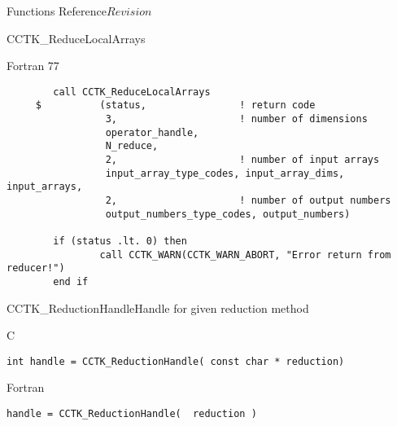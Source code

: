 \begin{cactuspart}{ Functions Reference}{}{$Revision$}
\begin{FunctionDescription}{CCTK\_ReduceLocalArrays}
\begin{ExampleSection}
\begin{Example}{Fortran 77}
\begin{verbatim}
        call CCTK_ReduceLocalArrays
     $          (status,                ! return code
                 3,                     ! number of dimensions
                 operator_handle,
                 N_reduce,
                 2,                     ! number of input arrays
                 input_array_type_codes, input_array_dims, input_arrays,
                 2,                     ! number of output numbers
                 output_numbers_type_codes, output_numbers)

        if (status .lt. 0) then
                call CCTK_WARN(CCTK_WARN_ABORT, "Error return from reducer!")
        end if

\end{verbatim}
\end{Example}
\end{ExampleSection}
\end{FunctionDescription}



\begin{FunctionDescription}{CCTK\_ReductionHandle}{Handle for given reduction method}
\label{CCTK-ReductionHandle}
\begin{SynopsisSection}
\begin{Synopsis}{C}
\begin{verbatim}int handle = CCTK_ReductionHandle( const char * reduction)\end{verbatim}
\end{Synopsis}
\begin{Synopsis}{Fortran}
\begin{verbatim}handle = CCTK_ReductionHandle(  reduction )


\end{verbatim}
\end{Synopsis}
\end{SynopsisSection}
\end{FunctionDescription}
\end{cactuspart}
